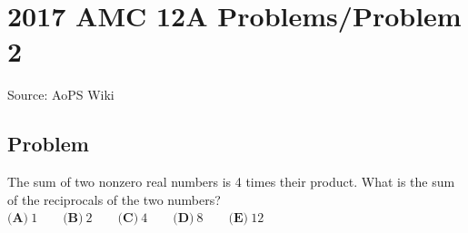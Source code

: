 \documentclass[12pt]{article}
\begin{document}
\section*{{2017 AMC 12A Problems/Problem 2}}
Source: AoPS Wiki

\subsection*{Problem}
The sum of two nonzero real numbers is 4 times their product. What is the sum of the reciprocals of the two numbers? $\textbf{(A)}\ 1\qquad\textbf{(B)}\ 2\qquad\textbf{(C)}\ 4\qquad\textbf{(D)}\ 8\qquad\textbf{(E)}\ 12$
\end{document}
